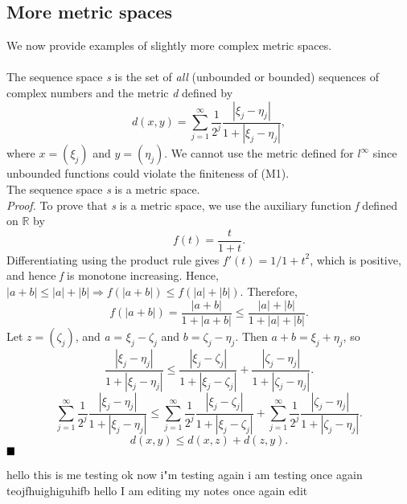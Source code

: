 \documentclass[11pt]{article}
\begin{document}
\subsection{More metric spaces}
We now provide examples of slightly more complex metric spaces.
\\\\
\noindent
{}
The sequence space \textit{s} is the set of \textit{all} (unbounded or bounded) sequences of complex numbers and the metric \textit{d} defined by
$$d(x, y) = \sum_{j=1}^\infty \frac{1}{2^j}\frac{|\xi_j - \eta_j|}{1 + |\xi_j - \eta_j|},$$
where $x = (\xi_j)$ and $y = (\eta_j)$. We cannot use the metric defined for $l^\infty$ since unbounded functions could violate the finiteness of (M1).
\\
 The sequence space \textit{s} is a metric space. 
\\\textit{Proof.}
To prove that \textit{s} is a metric space, we use the auxiliary function \textit{f} defined on $\mathbb{R}$ by
$$ f(t) = \frac{t}{1+t}.$$
Differentiating using the product rule gives $f'(t) = 1/{1+t}^2$, which is positive, and hence \textit{f} is monotone increasing. Hence, $|a + b| \leq |a| + |b| \Rightarrow f(|a+b|) \leq f(|a| + |b|).$ Therefore,
$$ f(|a + b|) = \frac{|a+b|}{1 + |a+b|} \leq \frac{|a| +|b|}{1 + |a| + |b|}.$$
Let $z = (\zeta_j)$, and \textit{a} = $\xi_j - \zeta_j$ and $\textit{b} = \zeta_j - \eta_j$. Then $a + b = \xi_j + \eta_j$, so 
$$\frac{|\xi_j - \eta_j|}{1 +|\xi_j - \eta_j|} \leq \frac{|\xi_j - \zeta_j|}{1+ |\xi_j - \zeta_j|} + \frac{|\zeta_j - \eta_j|}{1+|\zeta_j - \eta_j|}.$$
$$\sum_{j=1}^{\infty}\frac{1}{2^j}\frac{|\xi_j - \eta_j|}{1 +|\xi_j - \eta_j|} \leq \sum_{j=1}^{\infty}\frac{1}{2^j}\frac{|\xi_j - \zeta_j|}{1+ |\xi_j - \zeta_j|} + \sum_{j=1}^{\infty}\frac{1}{2^j}\frac{|\zeta_j - \eta_j|}{1+|\zeta_j - \eta_j|}.$$
$$d(x,y) \leq d(x, z) + d(z, y).$$ $\hfill \blacksquare$

hello this is me testing
ok now i"m testing again
i am testing once again
teojfhuighiguhifb
hello I am editing my notes
once again edit
\end{document}
